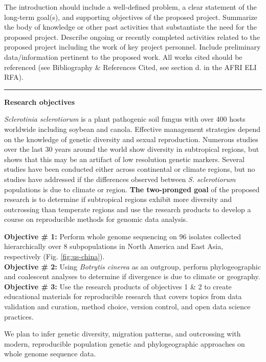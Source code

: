 \documentclass[12pt,letterpaper]{article}
\begin{document}
The introduction should include a well-defined problem, a clear statement of
the long-term goal(s), and supporting objectives of the proposed project.
Summarize the body of knowledge or other past activities that substantiate the
need for the proposed project. Describe ongoing or recently completed
activities related to the proposed project including the work of key project
personnel. Include preliminary data/information pertinent to the proposed
work. All works cited should be referenced (see Bibliography \& References
Cited, see section d. in the AFRI ELI RFA).\\
\rule{\textwidth}{0.5pt}

\noindent \textbf{Research objectives}

\textit{Sclerotinia sclerotiorum} is a plant pathogenic soil fungus with over 400 hosts worldwide including soybean and canola. 
Effective management strategies depend on the knowledge of genetic diversity and sexual reproduction.
Numerous studies over the last 30 years around the world show diversity in subtropical regions, but \cite{lehner2017sclerotinia} shows that this may be an artifact of low resolution genetic markers. 
Several studies have been conducted either across continental or climate regions, but no studies have addressed if the differences observed between \textit{S. sclerotiorum} populations is due to climate or region. 
\textbf{The two-pronged goal} of the proposed research is to determine if subtropical regions exhibit more diversity and outcrossing than temperate regions and use the research products to develop a course on reproducible methods for genomic data analysis.

\noindent
\textbf{Objective \# 1:} Perform whole genome sequencing on 96 isolates collected hierarchically over 8 subpopulations in North America and East Asia, respectively (Fig. \ref{fig:us-china}).\\
\textbf{Objective \# 2:} Using \textit{Botrytis cinerea} as an outgroup, perform phylogeographic and coalescent analyses to determine if divergence is due to climate or geography.\\
\textbf{Objective \# 3:} Use the research products of objectives 1 \& 2 to create educational materials for reproducible research that covers topics from
data validation and curation, method choice, version control, and open data science practices.

We plan to infer genetic diversity, migration patterns, and outcrossing with modern, reproducible population genetic and phylogeographic approaches on whole genome sequence data. 
\end{document}
